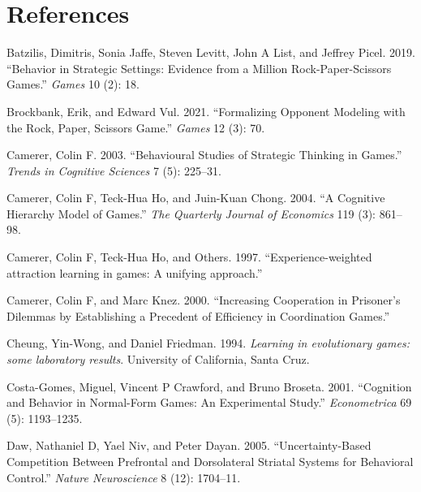 \documentclass[smallextended]{svjour3}       %
\newlength{\cslhangindent}
\newenvironment{CSLReferences}[2] %
 {%
  \setlength{\parindent}{0pt}
  \ifodd #1 \everypar{\setlength{\hangindent}{\cslhangindent}}\ignorespaces\fi
  \ifnum #2 > 0
  \setlength{\parskip}{#2\baselineskip}
  \fi
 }%
 {}
\begin{document}
\hypertarget{references}{%
\section*{References}\label{references}}

\hypertarget{refs}{}
\begin{CSLReferences}{1}{0}
\leavevmode{}%
Batzilis, Dimitris, Sonia Jaffe, Steven Levitt, John A List, and Jeffrey
Picel. 2019. {``Behavior in Strategic Settings: Evidence from a Million
Rock-Paper-Scissors Games.''} \emph{Games} 10 (2): 18.

\leavevmode{}%
Brockbank, Erik, and Edward Vul. 2021. {``Formalizing Opponent Modeling
with the Rock, Paper, Scissors Game.''} \emph{Games} 12 (3): 70.

\leavevmode{}%
Camerer, Colin F. 2003. {``Behavioural Studies of Strategic Thinking in
Games.''} \emph{Trends in Cognitive Sciences} 7 (5): 225--31.

\leavevmode{}%
Camerer, Colin F, Teck-Hua Ho, and Juin-Kuan Chong. 2004. {``A Cognitive
Hierarchy Model of Games.''} \emph{The Quarterly Journal of Economics}
119 (3): 861--98.

\leavevmode{}%
Camerer, Colin F, Teck-Hua Ho, and Others. 1997. {``{Experience-weighted
attraction learning in games: A unifying approach}.''}

\leavevmode{}%
Camerer, Colin F, and Marc Knez. 2000. {``{Increasing Cooperation in
Prisoner's Dilemmas by Establishing a Precedent of Efficiency in
Coordination Games}.''}

\leavevmode{}%
Cheung, Yin-Wong, and Daniel Friedman. 1994. \emph{{Learning in
evolutionary games: some laboratory results}}. University of California,
Santa Cruz.

\leavevmode{}%
Costa-Gomes, Miguel, Vincent P Crawford, and Bruno Broseta. 2001.
{``Cognition and Behavior in Normal-Form Games: An Experimental
Study.''} \emph{Econometrica} 69 (5): 1193--1235.

\leavevmode{}%
Daw, Nathaniel D, Yael Niv, and Peter Dayan. 2005. {``Uncertainty-Based
Competition Between Prefrontal and Dorsolateral Striatal Systems for
Behavioral Control.''} \emph{Nature Neuroscience} 8 (12): 1704--11.


\end{CSLReferences}
\end{document}
